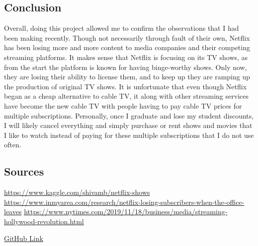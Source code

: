 \documentclass[
]{article}
\begin{document}
\hypertarget{conclusion}{%
\subsection{Conclusion}\label{conclusion}}

Overall, doing this project allowed me to confirm the observations that
I had been making recently. Though not necessarily through fault of
their own, Netflix has been losing more and more content to media
companies and their competing streaming platforms. It makes sense that
Netflix is focusing on its TV shows, as from the start the platform is
known for having binge-worthy shows. Only now, they are losing their
ability to license them, and to keep up they are ramping up the
production of original TV shows. It is unfortunate that even though
Netflix began as a cheap alternative to cable TV, it along with other
streaming services have become the new cable TV with people having to
pay cable TV prices for multiple subscriptions. Personally, once I
graduate and lose my student discounts, I will likely cancel everything
and simply purchase or rent shows and movies that I like to watch
instead of paying for these multiple subscriptions that I do not use
often.

\hypertarget{sources}{%
\subsection{Sources}\label{sources}}

\url{https://www.kaggle.com/shivamb/netflix-shows}
\url{https://www.inmyarea.com/research/netflix-losing-subscribers-when-the-office-leaves}
\url{https://www.nytimes.com/2019/11/18/business/media/streaming-hollywood-revolution.html}

\href{https://github.com/janettcasillas/finalproject_introtodatascience/blob/main/finalproject.Rmd}{GitHub
Link}
\end{document}
